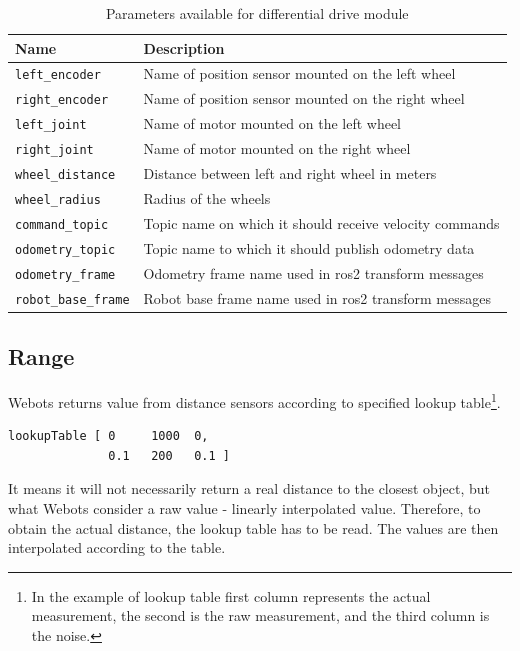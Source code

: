 \begin{table}[H]
    \centering
    \begin{tabular}{|l|l|}
        \hline
        \textbf{Name} & \textbf{Description} \\
        \hline
        \texttt{left\_encoder} & Name of position sensor mounted on the left wheel \\
        \hline
        \texttt{right\_encoder} & Name of position sensor mounted on the right wheel \\
        \hline
        \texttt{left\_joint} & Name of motor mounted on the left wheel \\
        \hline
        \texttt{right\_joint} & Name of motor mounted on the right wheel \\
        \hline
        \texttt{wheel\_distance} & Distance between left and right wheel in meters \\
        \hline
        \texttt{wheel\_radius} & Radius of the wheels \\
        \hline
        \texttt{command\_topic} & Topic name on which it should receive velocity commands \\
        \hline
        \texttt{odometry\_topic} & Topic name to which it should publish odometry data \\
        \hline
        \texttt{odometry\_frame} & Odometry frame name used in \ac{ros2} transform messages \\
        \hline
        \texttt{robot\_base\_frame} & Robot base frame name used in \ac{ros2} transform messages \\
        \hline
    \end{tabular}
    \caption{Parameters available for differential drive module}
    \label{tab:generalization:diff_driver_params}
\end{table}

\subsection{Range}
Webots returns value from distance sensors according to specified lookup table\footnote{In the example of lookup table first column represents the actual measurement, the second is the raw measurement, and the third column is the noise.}. 

\begin{verbatim}
lookupTable [ 0     1000  0,
              0.1   200   0.1 ]
\end{verbatim}

It means it will not necessarily return a real distance to the closest object, but what Webots consider a raw value - linearly interpolated value.
Therefore, to obtain the actual distance, the lookup table has to be read.
The values are then interpolated according to the table.

